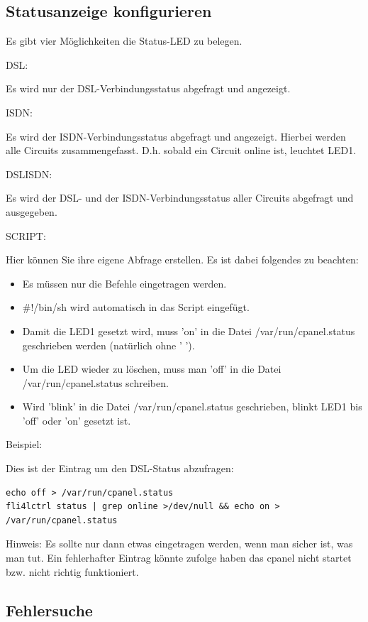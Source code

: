 \subsection{Statusanzeige konfigurieren}

Es gibt vier Möglichkeiten die Status-LED zu belegen.

DSL: 

Es wird nur der DSL-Verbindungsstatus abgefragt und angezeigt.

ISDN: 

Es wird der ISDN-Verbindungsstatus abgefragt und angezeigt. Hierbei werden alle 
Circuits zusammengefasst. D.h. sobald ein Circuit online ist, leuchtet LED1.

DSLISDN:

Es wird der DSL- und der ISDN-Verbindungsstatus aller Circuits abgefragt 
und ausgegeben.

SCRIPT:

Hier können Sie ihre eigene Abfrage erstellen. Es ist dabei folgendes zu beachten:
\begin{itemize}
    \item Es müssen nur die Befehle eingetragen werden.
    \item \#!/bin/sh wird automatisch in das Script eingefügt.
    \item Damit die LED1 gesetzt wird, muss 'on' in die Datei /var/run/cpanel.status 
           geschrieben werden (natürlich ohne ' ').
    \item Um die LED wieder zu löschen, muss man 'off' in die Datei /var/run/cpanel.status 
           schreiben.
    \item Wird 'blink' in die Datei /var/run/cpanel.status geschrieben, blinkt LED1 bis 'off'
           oder 'on' gesetzt ist.
\end{itemize}

Beispiel:

Dies ist der Eintrag um den DSL-Status abzufragen:
\begin{verbatim}
echo off > /var/run/cpanel.status
fli4lctrl status | grep online >/dev/null && echo on > /var/run/cpanel.status
\end{verbatim}
Hinweis: 
Es sollte nur dann etwas eingetragen werden, wenn man sicher ist, was man
tut. Ein fehlerhafter Eintrag könnte zufolge haben das cpanel nicht startet
bzw. nicht richtig funktioniert.

\subsection{Fehlersuche}
